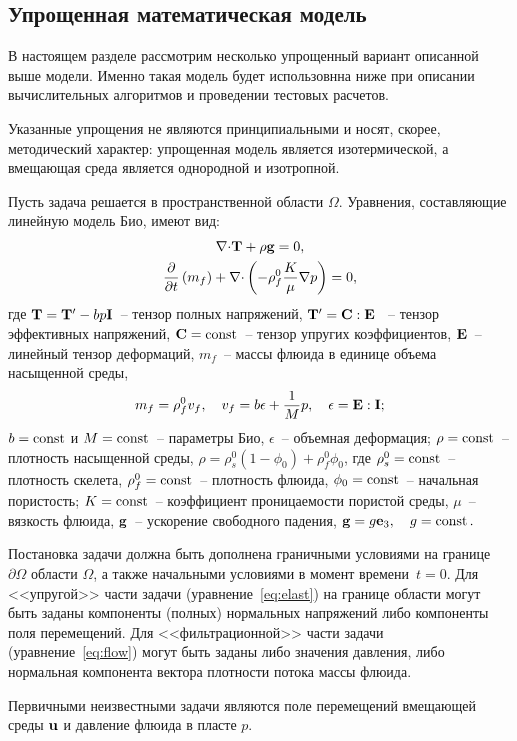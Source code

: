 
\subsection{Упрощенная математическая модель}

В настоящем разделе рассмотрим несколько упрощенный вариант описанной
выше модели. Именно такая модель будет использовнна ниже при
описании вычислительных алгоритмов и проведении тестовых расчетов. 

Указанные упрощения не являются принципиальными и носят, скорее,
методический характер: упрощенная модель является изотермической, 
а вмещающая среда является однородной и изотропной.

Пусть задача решается в пространственной области $\Omega$.
Уравнения, составляющие линейную модель Био, имеют вид:
%
\begin{gather}
\label{eq:elast}
\nabla \dpr\tn{T} +\rho\vc{g} = 0,\\
%
\label{eq:flow}
\dudx{}{t}\left( m_f \right) + \nabla \dpr \left( - \rho_f^0 \frac{K}{\mu}\nabla p\right) = 0,
%
\end{gather}
%
где
%
$\mathbf{T} = \mathbf{T}' - b p \mathbf{I}$~-- тензор полных напряжений, 
%
\(
\mathbf{T}' = \mathbf{C}:\mathbf{E}
\)
%
~-- тензор эффективных напряжений, $\mathbf{C}=\operatorname*{{const}}$~-- тензор упругих коэффициентов, 
$\mathbf{E}$~-- линейный тензор деформаций,
%
$m_f$~-- массы флюида в единице объема насыщенной среды,
%
\[
m_f = \rho_f^0 v_f, \quad v_f = b\epsilon + \frac{1}{M} p,\quad \epsilon = \mathbf{E}:\mathbf{I};
\]
%
$b=\operatorname*{{const}}$ и $M=\operatorname*{{const}}$~-- параметры Био,
 $\epsilon$~-- объемная деформация;
%
$\rho = \operatorname*{{const}}$~-- плотность насыщенной среды,
%
$\rho = \rho_s^0 (1-\phi_0) + \rho_f^0\phi_0$, где
%
$\rho_s^0=\operatorname*{{const}}$~-- плотность скелета, $\rho_f^0=\operatorname*{{const}}$~-- плотность флюида, $\phi_0=\operatorname*{{const}}$~-- начальная пористость;
%
$K=\operatorname*{{const}}$~-- коэффициент проницаемости пористой среды,
%
$\mu$~-- вязкость флюида,
%
$\mathbf{g}$~-- ускорение свободного падения, 
$
\mathbf{g} = g\mathbf{e}_3,\quad g = \operatorname*{{const}}.
$
%

Постановка задачи должна быть дополнена граничными условиями на границе $\partial\Omega$ области
$\Omega$, а также начальными условиями в момент времени~$t=0$. 
Для <<упругой>> части задачи (уравнение~\eqref{eq:elast}) на границе
области могут быть заданы компоненты (полных) нормальных напряжений
либо компоненты поля перемещений. Для <<фильтрационной>> части задачи
(уравнение~\eqref{eq:flow})
могут быть заданы либо значения давления, либо нормальная компонента
вектора плотности потока массы флюида.

Первичными неизвестными задачи являются поле перемещений вмещающей среды $\mathbf{u}$ и давление
флюида в пласте $p$.


\endinput
